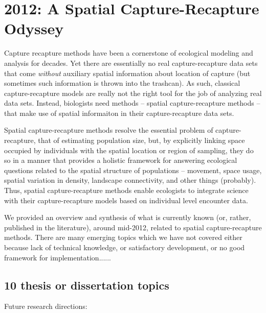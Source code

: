 


\chapter{
 2012: A Spatial Capture-Recapture Odyssey
 }

\label{chapt.final}

\vspace{0.3cm}


\vspace{2in}

Capture recapture methods have been a cornerstone of ecological
modeling and analysis for decades.  Yet there are essentially no real
capture-recapture data sets that come {\it without} auxiliary spatial
information about location of capture (but sometimes such information
is thrown into the trashcan).  As such, classical capture-recapture
models are really not the right tool for the job of analyzing real
data sets. Instead, biologists need methods -- spatial
capture-recapture methods -- that make use of spatial
informaiton in their capture-recapture data sets. 

Spatial capture-recapture methods resolve the essential problem of
capture-recapture, that of estimating population size, but, by
explicitly linking space occupied by individuals with the spatial
location or region of sampling, they do so in a manner that provides a
holistic framework for answering ecological questions related to the
spatial structure of populations -- movement, space usage, spatial
variation in density, landscape connectivity, and other things
(probably).  Thus, spatial capture-recapture methods enable ecologists
to integrate science with their capture-recapture models based on
individual level encounter data.

We provided an overview and synthesis of what is currently known (or,
rather, published in the literature),
around mid-2012, related to spatial capture-recapture methods. There
are many emerging topics which we have not covered either because lack
of technical knowledge, or satisfactory development, or no good
framework for implementation......



\section{10 thesis or dissertation topics}

Future research directions:

